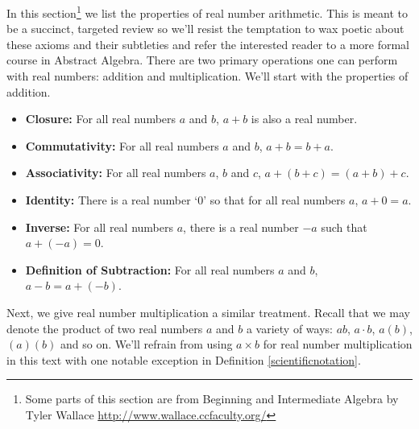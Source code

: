 

\setcounter{footnote}{0}

\label{AppRealNumberArithmetic}


In this section\footnote{Some parts of this section are from {\sc Beginning and Intermediate Algebra} by Tyler Wallace \url{http://www.wallace.ccfaculty.org/}} we list the properties of real number arithmetic.  This is meant to be a succinct, targeted review so we'll resist the temptation to wax poetic about these axioms and their subtleties and refer the interested reader to a more formal course in Abstract Algebra.  There are two primary operations one can perform with real numbers:  addition and multiplication.  We'll start with the properties of addition.

\medskip

\label{realnumberaddition}

\colorbox{ResultColor}{\bbm
\begin{thm}

\begin{itemize}

\item  \textbf{Closure:}  For all real numbers $a$ and $b$,  $a+b$ is also a real number.

\item  \textbf{Commutativity:}  For all real numbers $a$ and $b$, $a+b = b+a$.

\item  \textbf{Associativity:}  For all real numbers $a$, $b$ and $c$, $a+(b+c) = (a+b)+c$.

\item  \textbf{Identity:}  There is a real number `$0$' so that for all real numbers $a$, $a+0 = a$.

\item  \textbf{Inverse:}  For all real numbers $a$, there is a real number $-a$ such that $a + (-a) = 0$.

\item \textbf{Definition of Subtraction:}  For all real numbers $a$ and $b$, $a - b = a + (-b)$.

\end{itemize}
\end{thm}
\ebm}

\medskip

Next, we give real number multiplication a similar treatment.  Recall that we may denote the product of two real numbers $a$ and $b$ a variety of ways:  $ab$, $a \cdot b$, $a(b)$, $(a)(b)$ and so on.  We'll refrain from using $a \times b$ for real number multiplication in this text with one notable exception in Definition \ref{scientificnotation}.

